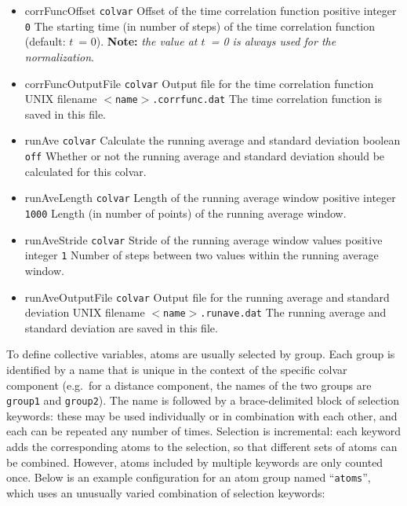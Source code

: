 \begin{itemize}
\item %
  \keydef
    {corrFuncOffset}{%
    \texttt{colvar}}{%
    Offset of the time correlation function}{%
    positive integer}{%
    \texttt{0}}{%
    The starting time (in number of steps) of the time correlation
    function (default: $t$~= 0).  \textbf{Note:} \emph{the value at $t$~= 0 is always
    used for the normalization}.}

\item %
  \keydef
    {corrFuncOutputFile}{%
    \texttt{colvar}}{%
    Output file for the time correlation function}{%
    UNIX filename}{%
    \texttt{$<$name$>$.corrfunc.dat}}{%
    The time correlation function is saved in this file.}

\item %
  \keydef
    {runAve}{%
    \texttt{colvar}}{%
    Calculate the running average and standard deviation}{%
    boolean}{%
    \texttt{off}}{%
    Whether or not the running average and standard deviation should
    be calculated for this colvar.}

\item %
  \keydef
    {runAveLength}{%
    \texttt{colvar}}{%
    Length of the running average window}{%
    positive integer}{%
    \texttt{1000}}{%
    Length (in number of points) of the running average window.}

\item %
  \keydef
    {runAveStride}{%
    \texttt{colvar}}{%
    Stride of the running average window values}{%
    positive integer}{%
    \texttt{1}}{%
    Number of steps between two values within the running average window.}

\item %
  \keydef
    {runAveOutputFile}{%
    \texttt{colvar}}{%
    Output file for the running average and standard deviation}{%
    UNIX filename}{%
    \texttt{$<$name$>$.runave.dat}}{%
    The running average and standard deviation are saved in this file.}

\end{itemize}


\label{sec:colvar_atom_groups}

\label{sec:colvar_atom_groups_sel}

To define collective variables, atoms are usually selected by group.  Each group is identified by a name that is unique in the context of the specific colvar component (e.g.~for a distance component, the names of the two groups are \texttt{group1} and \texttt{group2}).
The name is followed by a brace-delimited block of selection keywords: these may be used individually or in combination with each other, and each can be repeated any number of times.
Selection is incremental: each keyword adds the corresponding atoms to the selection, so that different sets of atoms can be combined.
However, atoms included by multiple keywords are only counted once.
Below is an example configuration for an atom group named ``\texttt{atoms}'', which uses an unusually varied combination of selection keywords:\\


